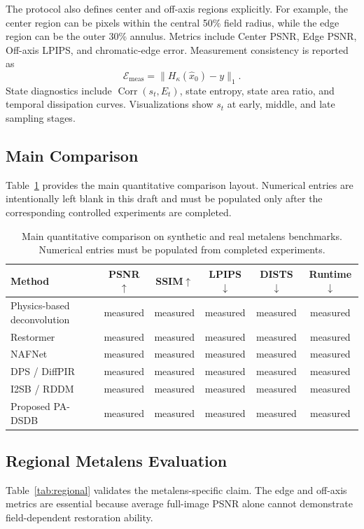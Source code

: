 \documentclass[journal]{IEEEtran}
\newcommand{\Corr}{\operatorname{Corr}}
\newcommand{\hk}{H_{\kappa}}
\begin{document}
The protocol also defines center and off-axis regions explicitly. For example, the center region can be pixels within the central 50\% field radius, while the edge region can be the outer 30\% annulus. Metrics include Center PSNR, Edge PSNR, Off-axis LPIPS, and chromatic-edge error. Measurement consistency is reported as
\begin{equation}
    \mathcal{E}_{\mathrm{meas}}=\|\hk(\hat{x}_0)-y\|_1.
\end{equation}
State diagnostics include $\Corr(s_t,E_t)$, state entropy, state area ratio, and temporal dissipation curves. Visualizations show $s_t$ at early, middle, and late sampling stages.

\subsection{Main Comparison}
Table~\ref{tab:main} provides the main quantitative comparison layout. Numerical entries are intentionally left blank in this draft and must be populated only after the corresponding controlled experiments are completed.

\begin{table}[t]
\centering
\caption{Main quantitative comparison on synthetic and real metalens benchmarks. Numerical entries must be populated from completed experiments.}
\label{tab:main}
\begin{tabular}{lccccc}
\toprule
Method & PSNR$\uparrow$ & SSIM$\uparrow$ & LPIPS$\downarrow$ & DISTS$\downarrow$ & Runtime$\downarrow$ \\
\midrule
Physics-based deconvolution & measured & measured & measured & measured & measured \\
Restormer & measured & measured & measured & measured & measured \\
NAFNet & measured & measured & measured & measured & measured \\
DPS / DiffPIR & measured & measured & measured & measured & measured \\
I2SB / RDDM & measured & measured & measured & measured & measured \\
Proposed PA-DSDB & measured & measured & measured & measured & measured \\
\bottomrule
\end{tabular}
\end{table}

\subsection{Regional Metalens Evaluation}
Table~\ref{tab:regional} validates the metalens-specific claim. The edge and off-axis metrics are essential because average full-image PSNR alone cannot demonstrate field-dependent restoration ability.
\end{document}
